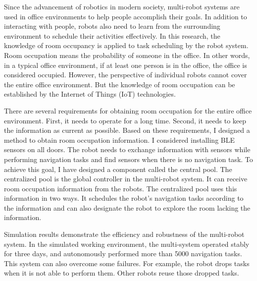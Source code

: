 
Since the advancement of robotics in modern society, multi-robot systems are used in office environments to help people accomplish their goals. In addition to interacting with people, robots also need to learn from the surrounding environment to schedule their activities effectively. 
In this research, the knowledge of room occupancy is applied to task scheduling by the robot system. Room occupation means the probability of someone in the office.  In other words, in a typical office environment,  if at least one person is in the office, the office is considered occupied. However, the perspective of individual robots cannot cover the entire office environment. But the knowledge of room occupation can be established by the Internet of Things (IoT) technologies.

There are several requirements for obtaining room occupation for the entire office environment. First, it needs to operate for a long time. Second, it needs to keep the information as current as possible. Based on these requirements, I designed a method to obtain room occupation information. I considered installing BLE sensors on all doors. The robot needs to exchange information with sensors while performing navigation tasks and find sensors when there is no navigation task. To achieve this goal, I have designed a component called the central pool. The centralized pool is the global controller in the multi-robot system. It can receive room occupation information from the robots. 
The centralized pool uses this information in two ways. It schedules the robot's navigation tasks according to the information and can also designate the robot to explore the room lacking the information.

Simulation results demonstrate the efficiency and robustness of the multi-robot system. In the simulated working environment, the multi-system operated stably for three days, and autonomously performed more than 5000 navigation tasks. This system can also overcome some failures. For example, the robot drops tasks when it is not able to perform them. Other robots reuse those dropped tasks.


\cleardoublepage
